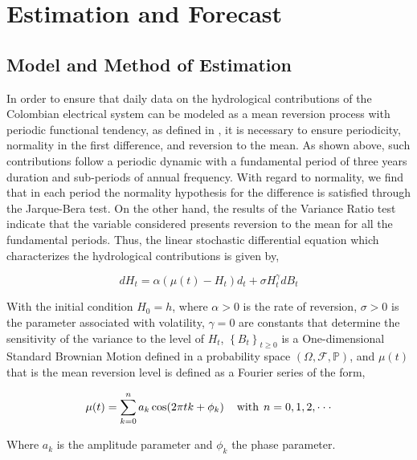 \documentclass[12pt,halfline,a4paper]{ouparticle}
\begin{document}
\section{Estimation and Forecast}\label{estimation}

\subsection{Model and Method of Estimation}

In order to ensure that daily data on the hydrological contributions of the Colombian electrical system can be modeled as a mean reversion process with periodic functional tendency, as defined in \cite{Monsalve2017}, it is necessary to ensure periodicity, normality in the first difference, and reversion to the mean. As shown above, such contributions follow a periodic dynamic with a fundamental period of three years duration and sub-periods of annual frequency. With regard to normality, we find that in each period the normality hypothesis for the difference is satisfied through the Jarque-Bera test. On the other hand, the results of the Variance Ratio test indicate that the variable considered presents reversion to the mean for all the fundamental periods. Thus, the linear stochastic differential equation which characterizes the hydrological contributions is given by, 

\begin{equation}
\label{ede}
dH_{t}=\alpha (\mu(t)-H_{t})d_{t}+\sigma H_{t}^{\gamma}dB_{t}
\end{equation}

With the initial condition $H_{0}=h$, where $\alpha>0$  is the rate of reversion, $\sigma>0$ is the parameter associated with volatility, $\gamma=0$ are constants that determine the sensitivity of the variance to the level of $H_{t}$, $\left \{B_{t}\right \}_{t\geq 0}$ is a One-dimensional Standard Brownian Motion defined in a probability space $(\Omega,\mathcal{F},\mathbb{P})$, and $\mu(t)$ that is the mean reversion level is defined as a Fourier series of the form,

\begin{equation}
\label{mu}
\mu(t)=\sum_{k=0}^{n}a_{k}\cos(2\pi tk+\phi_k) \hspace{0.4cm} \text{with} \hspace{0.15cm} n=0,1,2,\cdot\cdot\cdot
\end{equation}

Where $a_{k}$ is the amplitude parameter and $\phi_{k}$ the phase parameter. 
\end{document}
